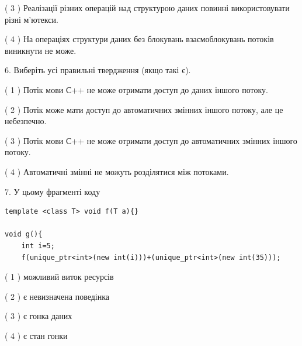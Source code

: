 \documentclass[12pt, ukrainian]{article}
\begin{document}
\begin {large}
{( 3 ) Реалізації різних операцій над структурою даних повинні використовувати різні м’ютекси.%

( 4 ) На операціях структури даних без блокувань взаємоблокувань потоків виникнути не може.%
\newpage



\vspace{5mm}
6. Виберіть усі правильні твердження (якщо такі є).\par
\vspace{2mm}

( 1 ) Потік мови С++ не може отримати доступ до даних іншого потоку.%

( 2 ) Потік може мати доступ до автоматичних змінних іншого потоку, але це небезпечно.%

( 3 ) Потік мови С++ не може отримати доступ до автоматичних змінних іншого потоку.%

( 4 ) Автоматичні змінні не можуть розділятися між потоками.%


\vspace{5mm}
7. У цьому фрагменті коду
\begin{verbatim}
template <class T> void f(T a){}

void g(){
    int i=5;
    f(unique_ptr<int>(new int(i)))+(unique_ptr<int>(new int(35)));
\end{verbatim}
( 1 ) можливий виток ресурсів%

( 2 ) є невизначена поведінка%

( 3 ) є гонка даних%

( 4 ) є стан гонки%
}
\end {large}
\end{document}

